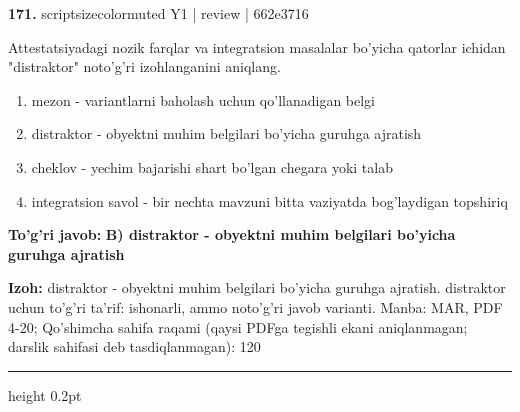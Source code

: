\documentclass[10pt,a4paper]{article}
\begin{document}
{\bfseries\sffamily\color{ink} 171.} {scriptsizecolor{muted} Y1 | review | 662e3716}
\par
Attestatsiyadagi nozik farqlar va integratsion masalalar bo'yicha qatorlar ichidan "distraktor" noto'g'ri izohlanganini aniqlang.
\begin{enumerate}[label=\Alph*),leftmargin=9mm]
\item mezon - variantlarni baholash uchun qo'llanadigan belgi
\item distraktor - obyektni muhim belgilari bo'yicha guruhga ajratish
\item cheklov - yechim bajarishi shart bo'lgan chegara yoki talab
\item integratsion savol - bir nechta mavzuni bitta vaziyatda bog'laydigan topshiriq
\end{enumerate}
\begin{tcolorbox}[enhanced,breakable,colback=teal!4,colframe=teal!60!black,boxrule=0.45pt,arc=1.2mm,left=2.7mm,right=2.7mm,top=1.8mm,bottom=1.8mm,before skip=2mm,after skip=2mm]
{\bfseries\sffamily\color{teal}To'g'ri javob:} \textbf{B) distraktor - obyektni muhim belgilari bo'yicha guruhga ajratish}
\par\smallskip
{\bfseries Izoh:} distraktor - obyektni muhim belgilari bo'yicha guruhga ajratish. distraktor uchun to'g'ri ta'rif: ishonarli, ammo noto'g'ri javob varianti. Manba: MAR, PDF 4-20; Qo'shimcha sahifa raqami (qaysi PDFga tegishli ekani aniqlanmagan; darslik sahifasi deb tasdiqlanmagan): 120
\end{tcolorbox}
\vspace{2mm}\hrule height 0.2pt\vspace{3mm}
\end{document}
